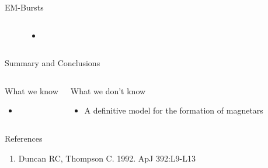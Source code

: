 \documentclass[hyperref=pdftex, presentation]{beamer}
\begin{document}
\begin{frame}{\Large EM-Bursts}
	\begin{figure}
		\begin{columns}[c] %
			
			\begin{itemize}
				\item<2->
			\end{itemize}
			
		\end{columns}
	\end{figure}
\end{frame}






\begin{frame}{Summary and Conclusions}

  \begin{columns}[c] %

			\begin{block}{What we know}
				\begin{itemize}
 					\item<2-> 
				\end{itemize}
			\end{block}
			\begin{block}{What we don't know}
				\begin{itemize}
 					\item<3-> A definitive model for the formation of magnetars %
				\end{itemize}
			\end{block}

		\end{columns}
\end{frame}


\begin{frame}{References}
	\begin{enumerate}
		\item Duncan RC, Thompson C. 1992. ApJ 392:L9-L13
	\end{enumerate}
\end{frame}
\end{document}
